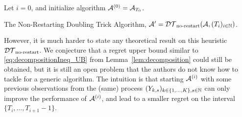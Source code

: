 \documentclass[12pt]{colt2018} %
\begin{document}
\vspace*{5pt}  %
\begin{framed}
\begin{algorithm}[H]
    \LinesNumbered  %
    \DontPrintSemicolon
    \BlankLine
    Let $i = 0$, and initialize algorithm $\mathcal{A}^{(0)} = \mathcal{A}_{T_0}$.\\
    \caption{The Non-Restarting Doubling Trick Algorithm, $\mathcal{A}' = \mathcal{DT}_{\text{no-restart}}(\mathcal{A}, (T_i)_{i\in\mathbb{N}})$.}
\label{algo:DTnr}
\end{algorithm}
\end{framed}
\vspace*{10pt}  %


However, it is much harder to state any  theoretical result on this heuristic $\mathcal{DT}_{\text{no-restart}}$.
We conjecture that a regret upper bound similar to \eqref{eq:decompositionIneq_UB} from Lemma~\ref{lem:decomposition} could still be obtained, but it is still an open problem that the authors do not know how to tackle for a generic algorithm.
%
The intuition is that starting $\mathcal{A}^{(i)}$ with some previous observations from the (same) \iid{} process $(Y_{k,s})_{k\in\{1,\dots,K\},s\in\mathbb{N}}$ can only improve the performance of $\mathcal{A}^{(i)}$,
and lead to a smaller regret on the interval $\{T_{i},\dots,T_{i+1}-1\}$.
\end{document}
